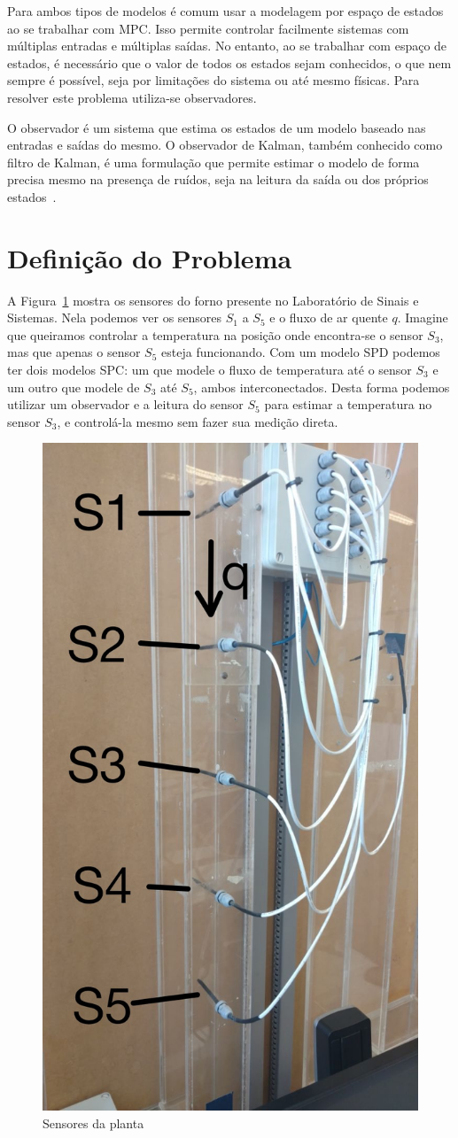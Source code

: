 Para ambos tipos de modelos é comum usar a modelagem por espaço de estados ao se
trabalhar com \ac{MPC}. Isso permite controlar facilmente sistemas com múltiplas
entradas e múltiplas saídas. No entanto, ao se trabalhar com espaço de estados,
é necessário que o valor de todos os estados sejam conhecidos, o que nem sempre
é possível, seja por limitações do sistema ou até mesmo físicas. Para resolver
este problema utiliza-se observadores.

O observador é um sistema que estima os estados de um modelo baseado nas
entradas e saídas do mesmo. O observador de Kalman, também conhecido como filtro
de Kalman, é uma formulação que permite estimar o modelo de forma precisa mesmo
na presença de ruídos, seja na leitura da saída ou dos próprios
estados~\cite{book:wang}.

\section{Definição do Problema}%
\label{sec:definicao-do-problema}

A Figura~\ref{fig:sensors-SPD} mostra os sensores do forno presente no
Laboratório de Sinais e Sistemas. Nela podemos ver os sensores \(S_1\) a \(S_5\)
e o fluxo de ar quente \( q \). Imagine que queiramos controlar a temperatura na
posição onde encontra-se o sensor \(S_3\), mas que apenas o sensor \(S_5\)
esteja funcionando. Com um modelo \ac{SPD} podemos ter dois modelos \ac{SPC}\@:
um que modele o fluxo de temperatura até o sensor \(S_3\) e um outro que modele
de \(S_3\) até \(S_5\), ambos interconectados. Desta forma podemos utilizar um
observador e a leitura do sensor \(S_5\) para estimar a temperatura no sensor
\(S_3\), e controlá-la mesmo sem fazer sua medição direta.

\begin{figure}[ht!]
    \centering
    \captionsetup{justification=centering}
    \includegraphics[height=0.5\linewidth]{imgs/planta-spd}
    \caption{Sensores da planta}%
    \label{fig:sensors-SPD}
\end{figure}

